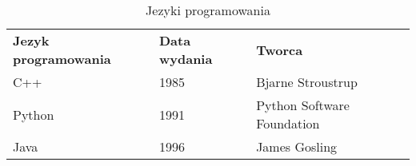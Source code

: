 \begin{table}[]
\begin{tabular}{lll}
\textbf{Jezyk programowania} & \textbf{Data wydania} & \textbf{Tworca}            \\
C++                          & 1985                  & Bjarne Stroustrup          \\
Python                       & 1991                  & Python Software Foundation \\
Java                         & 1996                  & James Gosling             
\end{tabular}
\label{tab:words}
    \caption{Jezyki programowania}
\end{table}